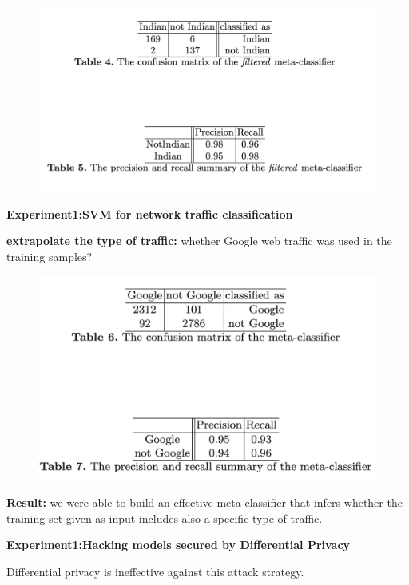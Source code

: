 \documentclass[11pt]{article}
\numberwithin{equation}{section}
\begin{document}
\begin{figure}[H]
    \centering
    \includegraphics[width = 15cm]{figures/e1_filtered.png}
    \label{fig:my_label}
\end{figure}

\textbf{Experiment1:SVM for network traffic classification}

\textbf{extrapolate the type of traffic:} whether Google web traffic was used in the training samples?

\begin{figure}[H]
    \centering
    \includegraphics[width = 15cm]{figures/google.png}
    \label{fig:my_label}
\end{figure}

\textbf{Result: }we were able to build an effective meta-classifier that infers whether the training set given as input includes also a specific type of traffic.


\textbf{Experiment1:Hacking models secured by Differential Privacy}

Differential privacy is ineffective against this attack strategy.
\end{document}
